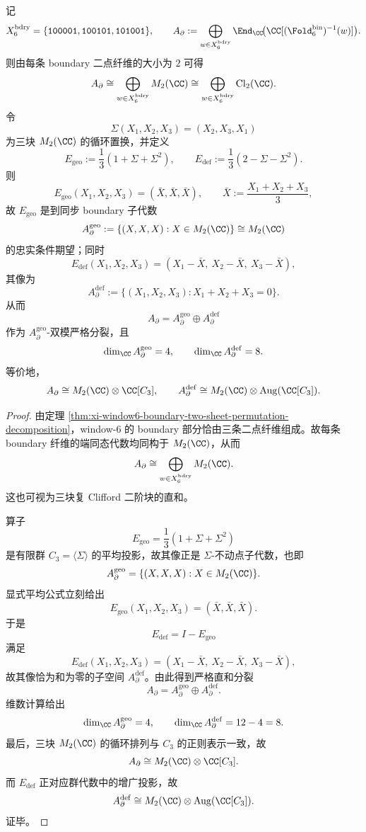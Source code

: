 \begin{theorem}\label{thm:conclusion-window6-boundary-ramanujan-clifford-augmentation-splitting}
记
\[
X_6^{\mathrm{bdry}}
=
\{\texttt{100001},\texttt{100101},\texttt{101001}\},
\qquad
A_{\partial}:=
\bigoplus_{w\in X_6^{\mathrm{bdry}}}
\End_{\CC}\!\bigl(\CC[(\Fold_6^{\mathrm{bin}})^{-1}(w)]\bigr).
\]
则由每条 boundary 二点纤维的大小为 \(2\) 可得
\[
A_{\partial}\cong \bigoplus_{w\in X_6^{\mathrm{bdry}}}M_2(\CC)
\cong
\bigoplus_{w\in X_6^{\mathrm{bdry}}}\mathrm{Cl}_2(\CC).
\]
令
\[
\Sigma(X_1,X_2,X_3)=(X_2,X_3,X_1)
\]
为三块 \(M_2(\CC)\) 的循环置换，并定义
\[
E_{\mathrm{geo}}:=\frac13(1+\Sigma+\Sigma^2),
\qquad
E_{\mathrm{def}}:=\frac13(2-\Sigma-\Sigma^2).
\]
则
\[
E_{\mathrm{geo}}(X_1,X_2,X_3)=(\bar X,\bar X,\bar X),
\qquad
\bar X:=\frac{X_1+X_2+X_3}{3},
\]
故 \(E_{\mathrm{geo}}\) 是到同步 boundary 子代数
\[
A_{\partial}^{\mathrm{geo}}
:=
\{(X,X,X):X\in M_2(\CC)\}
\cong M_2(\CC)
\]
的忠实条件期望；同时
\[
E_{\mathrm{def}}(X_1,X_2,X_3)
=(X_1-\bar X,\ X_2-\bar X,\ X_3-\bar X),
\]
其像为
\[
A_{\partial}^{\mathrm{def}}
:=
\{(X_1,X_2,X_3):X_1+X_2+X_3=0\}.
\]
从而
\[
A_{\partial}=A_{\partial}^{\mathrm{geo}}\oplus A_{\partial}^{\mathrm{def}}
\]
作为 \(A_{\partial}^{\mathrm{geo}}\)-双模严格分裂，且
\[
\dim_{\CC}A_{\partial}^{\mathrm{geo}}=4,
\qquad
\dim_{\CC}A_{\partial}^{\mathrm{def}}=8.
\]
等价地，
\[
A_{\partial}\cong M_2(\CC)\otimes \CC[C_3],
\qquad
A_{\partial}^{\mathrm{def}}
\cong
M_2(\CC)\otimes \mathrm{Aug}(\CC[C_3]).
\]
\end{theorem}
\begin{proof}
由定理 \ref{thm:xi-window6-boundary-two-sheet-permutation-decomposition}，window-\(6\) 的 boundary 部分恰由三条二点纤维组成。故每条 boundary 纤维的端同态代数均同构于 \(M_2(\CC)\)，从而
\[
A_{\partial}\cong \bigoplus_{w\in X_6^{\mathrm{bdry}}}M_2(\CC).
\]
这也可视为三块复 Clifford 二阶块的直和。

算子
\[
E_{\mathrm{geo}}=\frac13(1+\Sigma+\Sigma^2)
\]
是有限群 \(C_3=\langle \Sigma\rangle\) 的平均投影，故其像正是 \(\Sigma\)-不动点子代数，也即
\[
A_{\partial}^{\mathrm{geo}}
=
\{(X,X,X):X\in M_2(\CC)\}.
\]
显式平均公式立刻给出
\[
E_{\mathrm{geo}}(X_1,X_2,X_3)=(\bar X,\bar X,\bar X).
\]
于是
\[
E_{\mathrm{def}}=I-E_{\mathrm{geo}}
\]
满足
\[
E_{\mathrm{def}}(X_1,X_2,X_3)=(X_1-\bar X,\ X_2-\bar X,\ X_3-\bar X),
\]
故其像恰为和为零的子空间 \(A_{\partial}^{\mathrm{def}}\)。由此得到严格直和分裂
\[
A_{\partial}=A_{\partial}^{\mathrm{geo}}\oplus A_{\partial}^{\mathrm{def}}.
\]
维数计算给出
\[
\dim_{\CC}A_{\partial}^{\mathrm{geo}}=4,\qquad
\dim_{\CC}A_{\partial}^{\mathrm{def}}=12-4=8.
\]
最后，三块 \(M_2(\CC)\) 的循环排列与 \(C_3\) 的正则表示一致，故
\[
A_{\partial}\cong M_2(\CC)\otimes \CC[C_3].
\]
而 \(E_{\mathrm{def}}\) 正对应群代数中的增广投影，故
\[
A_{\partial}^{\mathrm{def}}
\cong
M_2(\CC)\otimes \mathrm{Aug}(\CC[C_3]).
\]
证毕。
\end{proof}

